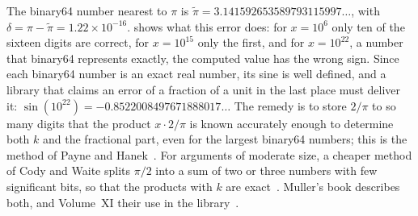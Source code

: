 The binary64 number nearest to $\pi$ is $\tilde\pi=3.141592653589793115997\ldots$, with $\delta=\pi-\tilde\pi=1.22\times10^{-16}$.  shows what this error does: for $x=10^6$ only ten of the sixteen digits are correct, for $x=10^{15}$ only the first, and for $x=10^{22}$, a number that binary64 represents exactly, the computed value has the wrong sign. Since each binary64 number is an exact real number, its sine is well defined, and a library that claims an error of a fraction of a unit in the last place must deliver it: $\sin(10^{22})=-0.8522008497671888017\ldots$ The remedy is to store $2/\pi$ to so many digits that the product $x\cdot2/\pi$ is known accurately enough to determine both $k$ and the fractional part, even for the largest binary64 numbers; this is the method of Payne and Hanek~\cite{payne1983}. For arguments of moderate size, a cheaper method of Cody and Waite splits $\pi/2$ into a sum of two or three numbers with few significant bits, so that the products with $k$ are exact~\cite{cody1980}. Muller's book describes both, and Volume~XI their use in the library~\cite{muller2016elementary}.

\begin{table}
\end{table}

